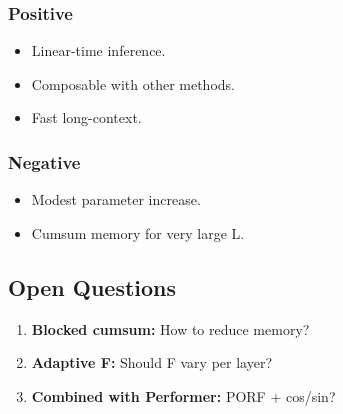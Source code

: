 \subsubsection{Positive}
\begin{itemize}
\item Linear-time inference.
\item Composable with other methods.
\item Fast long-context.

\end{itemize}
\subsubsection{Negative}
\begin{itemize}
\item Modest parameter increase.
\item Cumsum memory for very large L.

\end{itemize}
\subsection{Open Questions}

\begin{enumerate}
\item \textbf{Blocked cumsum:} How to reduce memory?
\item \textbf{Adaptive F:} Should F vary per layer?
\item \textbf{Combined with Performer:} PORF + cos/sin?

\end{enumerate}
